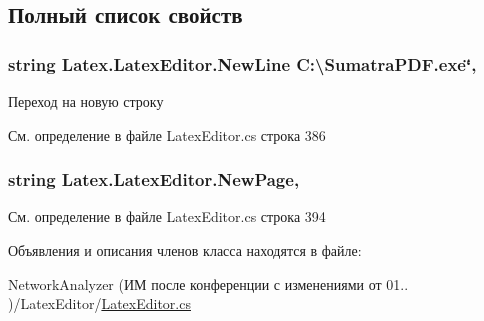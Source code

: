 \subsection{Полный список свойств}
\subsubsection[{\texorpdfstring{New\+Line}{NewLine}}]{\setlength{\rightskip}{0pt plus 5cm}string Latex.\+Latex\+Editor.\+New\+Line C\+:\textbackslash{}\+Sumatra\+P\+D\+F.\+exe\char`\"{}\hspace{0.3cm}{\ttfamily [static]}, {\ttfamily [get]}}\hypertarget{class_latex_1_1_latex_editor_aeba08fa7a4f2ff2ab9752bb496841c7c}{}\label{class_latex_1_1_latex_editor_aeba08fa7a4f2ff2ab9752bb496841c7c}


Переход на новую строку 



См. определение в файле Latex\+Editor.\+cs строка 386

\subsubsection[{\texorpdfstring{New\+Page}{NewPage}}]{\setlength{\rightskip}{0pt plus 5cm}string Latex.\+Latex\+Editor.\+New\+Page\hspace{0.3cm}{\ttfamily [static]}, {\ttfamily [get]}}\hypertarget{class_latex_1_1_latex_editor_a1899d954c17ac9ad27a773f0d1ee9d61}{}\label{class_latex_1_1_latex_editor_a1899d954c17ac9ad27a773f0d1ee9d61}


См. определение в файле Latex\+Editor.\+cs строка 394



Объявления и описания членов класса находятся в файле\+:\begin{DoxyCompactItemize}
\item 
Network\+Analyzer (ИМ после конференции  с изменениями от 01.. )/\+Latex\+Editor/\hyperlink{_latex_editor_8cs}{Latex\+Editor.\+cs}\end{DoxyCompactItemize}
